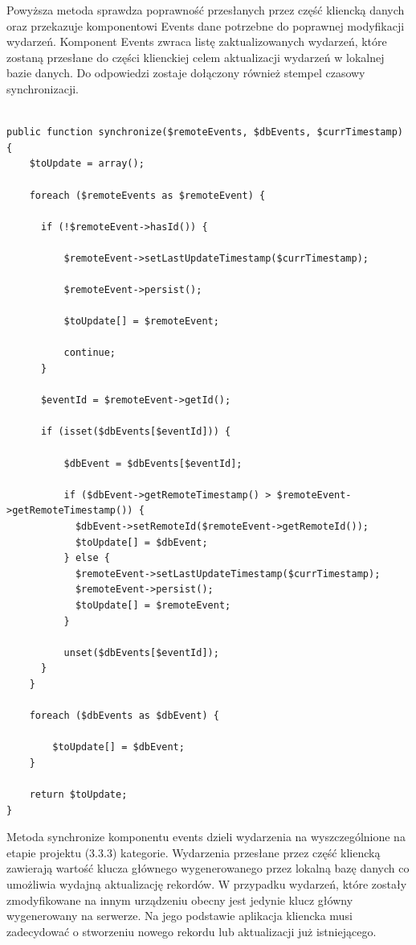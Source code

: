 Powyższa metoda sprawdza poprawność przesłanych przez część kliencką danych oraz przekazuje komponentowi Events dane potrzebne do poprawnej modyfikacji wydarzeń. Komponent Events zwraca listę zaktualizowanych wydarzeń, które zostaną przesłane do części klienckiej celem aktualizacji wydarzeń w lokalnej bazie danych. Do odpowiedzi zostaje dołączony również stempel czasowy synchronizacji.

\begin{lstlisting}[caption=Modyfikacja wydarzeń w metodzie synchronize komponentu Events., label=amb, captionpos=b]

public function synchronize($remoteEvents, $dbEvents, $currTimestamp) {
   	$toUpdate = array();

   	foreach ($remoteEvents as $remoteEvent) {

      if (!$remoteEvent->hasId()) {

	      $remoteEvent->setLastUpdateTimestamp($currTimestamp);

          $remoteEvent->persist();

          $toUpdate[] = $remoteEvent;

          continue;
      }

      $eventId = $remoteEvent->getId();

      if (isset($dbEvents[$eventId])) {

          $dbEvent = $dbEvents[$eventId];

          if ($dbEvent->getRemoteTimestamp() > $remoteEvent->getRemoteTimestamp()) {
          	$dbEvent->setRemoteId($remoteEvent->getRemoteId());
            $toUpdate[] = $dbEvent;
          } else {
            $remoteEvent->setLastUpdateTimestamp($currTimestamp);
            $remoteEvent->persist();
            $toUpdate[] = $remoteEvent;
          }

          unset($dbEvents[$eventId]);
      }
    }

    foreach ($dbEvents as $dbEvent) {

       	$toUpdate[] = $dbEvent;
    }

   	return $toUpdate;
}

\end{lstlisting}

Metoda synchronize komponentu events dzieli wydarzenia na wyszczególnione na etapie projektu (3.3.3) kategorie. Wydarzenia przesłane przez część kliencką zawierają wartość klucza głównego wygenerowanego przez lokalną bazę danych co umożliwia wydajną aktualizację rekordów. W przypadku wydarzeń, które zostały zmodyfikowane na innym urządzeniu obecny jest jedynie klucz główny wygenerowany na serwerze. Na jego podstawie aplikacja kliencka musi zadecydować o stworzeniu nowego rekordu lub aktualizacji już istniejącego.
